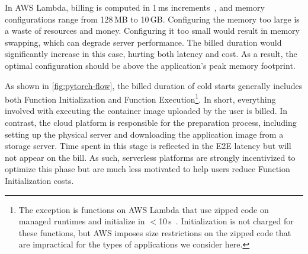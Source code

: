 \documentclass[sigplan,nonacm]{acmart}
\begin{document}
\noindent
In AWS Lambda, billing is computed in 1\,ms increments~\cite{lambdaPrice}, and memory configurations range from 128\,MB to 10\,GB.
Configuring the memory too large is a waste of resources and money.
Configuring it too small would result in memory swapping, which can degrade server performance.
The billed duration would significantly increase in this case, hurting both latency and cost.
As a result, the optimal configuration should be above the application's peak memory footprint.

As shown in \cref{fig:pytorch-flow}, the billed duration of cold starts generally includes both Function Initialization and Function Execution\footnote{The exception is functions on AWS Lambda that use zipped code on managed runtimes and initialize in $<$10\,s~\cite{lambdafree-blog}.
Initialization is not charged for these functions, but AWS imposes size restrictions on the zipped code that are impractical for the types of applications we consider here.}.
In short, everything involved with executing the container image uploaded by the user is billed. 
In contrast, the cloud platform is responsible for the preparation process, including setting up the physical server and downloading the application image from a storage server.
Time spent in this stage is reflected in the E2E latency but will not appear on the bill.
As such, serverless platforms are strongly incentivized to optimize this phase but are much less motivated to help users reduce Function Initialization costs.
 
\end{document}
